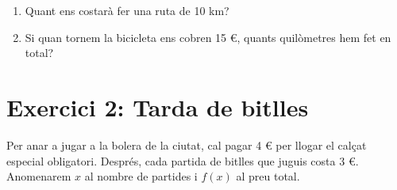 \documentclass[12pt,a4paper]{article}
\begin{document}
\begin{enumerate}[label=\alph*)]
    \vspace{0.5cm}
    \item Quant ens costarà fer una ruta de 10 km?
    \vspace{1cm}
    
    \item Si quan tornem la bicicleta ens cobren 15 €, quants quilòmetres hem fet en total?
    \vspace{1cm}
\end{enumerate}

\section*{Exercici 2: Tarda de bitlles}
Per anar a jugar a la bolera de la ciutat, cal pagar 4 € per llogar el calçat especial obligatori. Després, cada partida de bitlles que juguis costa 3 €. Anomenarem $x$ al nombre de partides i $f(x)$ al preu total.
\end{document}
